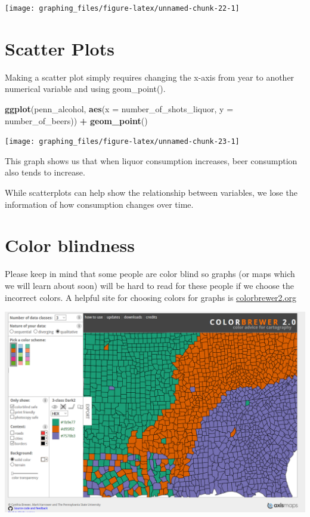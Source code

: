\documentclass[
  12pt,
]{book}
\newenvironment{Shaded}{\begin{snugshade}}{\end{snugshade}}
\newcommand{\DataTypeTok}[1]{\textcolor[rgb]{0.13,0.29,0.53}{#1}}
\newcommand{\KeywordTok}[1]{\textcolor[rgb]{0.13,0.29,0.53}{\textbf{#1}}}
\newcommand{\NormalTok}[1]{#1}
\newcommand{\OperatorTok}[1]{\textcolor[rgb]{0.81,0.36,0.00}{\textbf{#1}}}
\newcommand{\StringTok}[1]{\textcolor[rgb]{0.31,0.60,0.02}{#1}}
\begin{document}
\begin{center}\texttt{[image: graphing\_files/figure-latex/unnamed-chunk-22-1]} \end{center}

\hypertarget{scatter-plots}{%
\section{Scatter Plots}\label{scatter-plots}}

Making a scatter plot simply requires changing the x-axis from year to another numerical variable and using geom\_point().

\begin{Shaded}
\begin{Highlighting}[]
\KeywordTok{ggplot}\NormalTok{(penn\_alcohol, }\KeywordTok{aes}\NormalTok{(}\DataTypeTok{x =}\NormalTok{ number\_of\_shots\_liquor,}
                         \DataTypeTok{y =}\NormalTok{ number\_of\_beers)) }\OperatorTok{+}
\StringTok{  }\KeywordTok{geom\_point}\NormalTok{()}
\end{Highlighting}
\end{Shaded}

\begin{center}\texttt{[image: graphing\_files/figure-latex/unnamed-chunk-23-1]} \end{center}

This graph shows us that when liquor consumption increases, beer consumption also tends to increase.

While scatterplots can help show the relationship between variables, we lose the information of how consumption changes over time.

\hypertarget{color-blindness}{%
\section{Color blindness}\label{color-blindness}}

Please keep in mind that some people are color blind so graphs (or maps which we will learn about soon) will be hard to read for these people if we choose the incorrect colors. A helpful site for choosing colors for graphs is \href{http://colorbrewer2.org}{colorbrewer2.org}

\includegraphics{images/colorbrewer.PNG}
\end{document}
